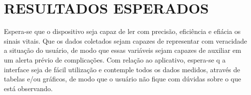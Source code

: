 \section{RESULTADOS ESPERADOS}

Espera-se que o dispositivo seja capaz de ler com precisão, eficiência e efiácia os sinais vitais. Que os dados coletados sejam capazes de representar com veracidade a situação do usuário, de modo que essas variáveis sejam capazes de auxiliar em um alerta prévio de complicações. Com relação ao aplicativo, espera-se q a interface seja de fácil utilização e contemple todos os dados medidos, através de tabelas e/ou gráficos, de modo que o usuário não fique com dúvidas sobre o que está observando.





